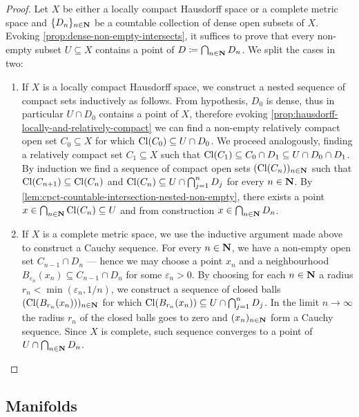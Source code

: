 \begin{proof}
Let \(X\) be either a locally compact Hausdorff space or a complete metric space
and \(\{D_n\}_{n \in \mathbf{N}}\) be a countable collection of dense open subsets of
\(X\). Evoking \cref{prop:dense-non-empty-intersects}, it suffices to prove that
every non-empty subset \(U \subseteq X\) contains a point of
\(D \coloneq \bigcap_{n \in \mathbf{N}} D_n\). We split the cases in two:
\begin{enumerate}\setlength\itemsep{0em}
\item If \(X\) is a locally compact Hausdorff space, we construct a nested
  sequence of compact sets inductively as follows. From hypothesis, \(D_0\) is
  dense, thus in particular \(U \cap D_0\) contains a point of \(X\), therefore
  evoking \cref{prop:hausdorff-locally-and-relatively-compact} we can find a
  non-empty relatively compact open set \(C_0 \subseteq X\) for which
  \(\operatorname{Cl}(C_0) \subseteq U \cap D_0\). We proceed analogously, finding a
  relatively compact set \(C_1 \subseteq X\) such that
  \(\operatorname{Cl}(C_1) \subseteq C_0 \cap D_1 \subseteq U \cap D_0 \cap D_1\). By
  induction we find a sequence of compact open sets \((\operatorname{Cl}(C_n))_{n \in \mathbf{N}}\)
  such that \(\operatorname{Cl}(C_{n+1}) \subseteq \operatorname{Cl}(C_{n})\) and
  \(\operatorname{Cl}(C_n) \subseteq U \cap \bigcap_{j=1}^n D_j\) for every \(n \in \mathbf{N}\). By
  \cref{lem:cpct-countable-intersection-nested-non-empty}, there exists a point
  \(x \in \bigcap_{n \in \mathbf{N}} \operatorname{Cl}(C_n) \subseteq U\) and from construction
  \(x \in \bigcap_{n \in \mathbf{N}} D_n\).

\item If \(X\) is a complete metric space, we use the inductive argument made
  above to construct a Cauchy sequence. For every \(n \in \mathbf{N}\), we have a
  non-empty open set \(C_{n-1} \cap D_n\) --- hence we may choose a point
  \(x_n\) and a neighbourhood
  \(B_{\varepsilon_n}(x_n) \subseteq C_{n-1} \cap D_n\) for some
  \(\varepsilon_n > 0\). By choosing for each \(n \in \mathbf{N}\) a radius
  \(r_n < \min(\varepsilon_n, 1/n)\), we construct a sequence of closed balls
  \((\operatorname{Cl}(B_{r_n}(x_n)))_{n \in \mathbf{N}}\) for which
  \(\operatorname{Cl}(B_{r_n}(x_n)) \subseteq U \cap \bigcap_{j=1}^n D_j\). In the limit
  \(n \to \infty\) the radius \(r_n\) of the closed balls goes to zero and
  \((x_n)_{n \in \mathbf{N}}\) form a Cauchy sequence. Since \(X\) is complete, such
  sequence converges to a point of \(U \cap \bigcap_{n \in \mathbf{N}} D_n\).
\end{enumerate}
\end{proof}

\subsection{Manifolds}


